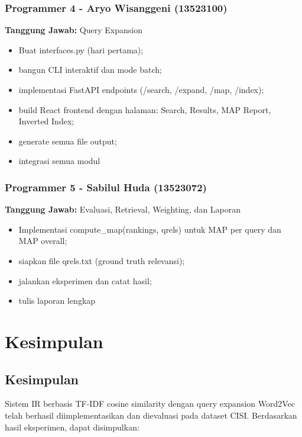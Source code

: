 \documentclass[12pt,a4paper]{report}
\begin{document}
\subsection{Programmer 4 - Aryo Wisanggeni (13523100)}
\textbf{Tanggung Jawab:} Query Expansion
\begin{itemize}
    \item Buat interfaces.py (hari pertama); 
    \item bangun CLI interaktif dan mode batch; 
    \item implementasi FastAPI endpoints (/search, /expand, /map, /index); 
    \item build React frontend dengan halaman: Search, Results, MAP Report, Inverted Index; 
    \item generate semua file output; 
    \item integrasi semua modul
\end{itemize}

\subsection{Programmer 5 - Sabilul Huda (13523072)}
\textbf{Tanggung Jawab:} Evaluasi, Retrieval, Weighting, dan Laporan
\begin{itemize}
    \item Implementasi compute\_map(rankings, qrels) untuk MAP per query dan MAP overall; 
    \item siapkan file qrels.txt (ground truth relevansi); 
    \item jalankan eksperimen dan catat hasil; 
    \item tulis laporan lengkap
\end{itemize}

\chapter{Kesimpulan}

\section{Kesimpulan}
Sistem IR berbasis TF-IDF cosine similarity dengan query expansion Word2Vec telah berhasil diimplementasikan dan dievaluasi pada dataset CISI. Berdasarkan hasil eksperimen, dapat disimpulkan:
\end{document}
